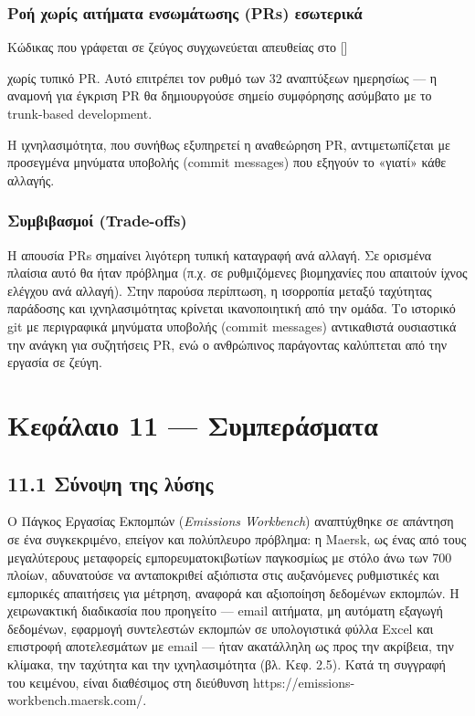 \documentclass[11pt,a4paper,greek,twoside]{template-xe}
\let\origtexttt\texttt
\renewcommand{\texttt}[1]{%
  \begingroup
  \StrSubstitute{#1}{.}{.\allowbreak}[\tttmp]%
  \origtexttt{\tttmp}%
  \endgroup
}
\begin{document}
\subsection{Ροή χωρίς αιτήματα ενσωμάτωσης (PRs)
εσωτερικά}\label{ux3c1ux3bfux3ae-ux3c7ux3c9ux3c1ux3afux3c2-ux3b1ux3b9ux3c4ux3aeux3bcux3b1ux3c4ux3b1-ux3b5ux3bdux3c3ux3c9ux3bcux3acux3c4ux3c9ux3c3ux3b7ux3c2-prs-ux3b5ux3c3ux3c9ux3c4ux3b5ux3c1ux3b9ux3baux3ac}

Κώδικας που γράφεται σε ζεύγος συγχωνεύεται απευθείας στο \texttt{main}
χωρίς τυπικό PR. Αυτό επιτρέπει τον ρυθμό των 32 αναπτύξεων ημερησίως
--- η αναμονή για έγκριση PR θα δημιουργούσε σημείο συμφόρησης ασύμβατο
με το trunk-based development.

Η ιχνηλασιμότητα, που συνήθως εξυπηρετεί η αναθεώρηση PR,
αντιμετωπίζεται με προσεγμένα μηνύματα υποβολής (commit messages) που
εξηγούν το «γιατί» κάθε αλλαγής.

\subsection{Συμβιβασμοί
(Trade-offs)}\label{ux3c3ux3c5ux3bcux3b2ux3b9ux3b2ux3b1ux3c3ux3bcux3bfux3af-trade-offs}

Η απουσία PRs σημαίνει λιγότερη τυπική καταγραφή ανά αλλαγή. Σε ορισμένα
πλαίσια αυτό θα ήταν πρόβλημα (π.χ. σε ρυθμιζόμενες βιομηχανίες που
απαιτούν ίχνος ελέγχου ανά αλλαγή). Στην παρούσα περίπτωση, η ισορροπία
μεταξύ ταχύτητας παράδοσης και ιχνηλασιμότητας κρίνεται ικανοποιητική
από την ομάδα. Το ιστορικό git με περιγραφικά μηνύματα υποβολής (commit
messages) αντικαθιστά ουσιαστικά την ανάγκη για συζητήσεις PR, ενώ ο
ανθρώπινος παράγοντας καλύπτεται από την εργασία σε ζεύγη.

\chapter{Κεφάλαιο 11 ---
Συμπεράσματα}\label{ux3baux3b5ux3c6ux3acux3bbux3b1ux3b9ux3bf-11-ux3c3ux3c5ux3bcux3c0ux3b5ux3c1ux3acux3c3ux3bcux3b1ux3c4ux3b1}

\section{11.1 Σύνοψη της
λύσης}\label{ux3c3ux3cdux3bdux3bfux3c8ux3b7-ux3c4ux3b7ux3c2-ux3bbux3cdux3c3ux3b7ux3c2}

Ο Πάγκος Εργασίας Εκπομπών (\emph{Emissions Workbench}) αναπτύχθηκε σε
απάντηση σε ένα συγκεκριμένο, επείγον και πολύπλευρο πρόβλημα: η Maersk,
ως ένας από τους μεγαλύτερους μεταφορείς εμπορευματοκιβωτίων παγκοσμίως
με στόλο άνω των 700 πλοίων, αδυνατούσε να ανταποκριθεί αξιόπιστα στις
αυξανόμενες ρυθμιστικές και εμπορικές απαιτήσεις για μέτρηση, αναφορά
και αξιοποίηση δεδομένων εκπομπών. Η χειρωνακτική διαδικασία που
προηγείτο --- email αιτήματα, μη αυτόματη εξαγωγή δεδομένων, εφαρμογή
συντελεστών εκπομπών σε υπολογιστικά φύλλα Excel και επιστροφή
αποτελεσμάτων με email --- ήταν ακατάλληλη ως προς την ακρίβεια, την
κλίμακα, την ταχύτητα και την ιχνηλασιμότητα (βλ. Κεφ. 2.5). Κατά τη
συγγραφή του κειμένου, είναι διαθέσιμος στη διεύθυνση
https://emissions-workbench.maersk.com/.
\end{document}
